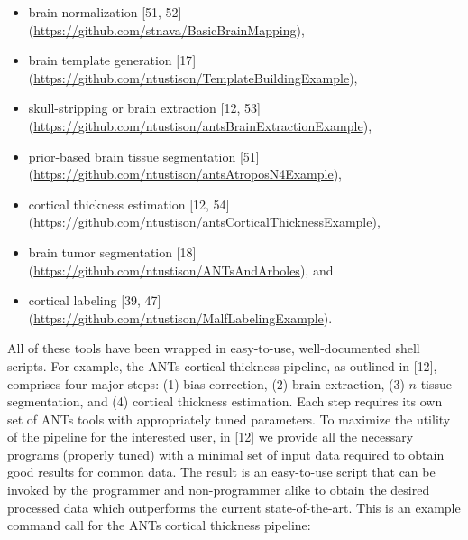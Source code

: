 \documentclass[11pt,]{article}
\newenvironment{Shaded}{\begin{snugshade}}{\end{snugshade}}
\newcommand{\KeywordTok}[1]{\textcolor[rgb]{0.13,0.29,0.53}{\textbf{{#1}}}}
\newcommand{\CommentTok}[1]{\textcolor[rgb]{0.56,0.35,0.01}{\textit{{#1}}}}
\newcommand{\NormalTok}[1]{{#1}}
\begin{document}
\begin{itemize}
\itemsep1pt\parskip0pt
\item
  brain normalization {[}51, 52{]}
  (\url{https://github.com/stnava/BasicBrainMapping}),
\item
  brain template generation {[}17{]}
  (\url{https://github.com/ntustison/TemplateBuildingExample}),
\item
  skull-stripping or brain extraction {[}12, 53{]}
  (\url{https://github.com/ntustison/antsBrainExtractionExample}),
\item
  prior-based brain tissue segmentation {[}51{]}
  (\url{https://github.com/ntustison/antsAtroposN4Example}),
\item
  cortical thickness estimation {[}12, 54{]}
  (\url{https://github.com/ntustison/antsCorticalThicknessExample}),
\item
  brain tumor segmentation {[}18{]}
  (\url{https://github.com/ntustison/ANTsAndArboles}), and
\item
  cortical labeling {[}39, 47{]}
  (\url{https://github.com/ntustison/MalfLabelingExample}).
\end{itemize}

All of these tools have been wrapped in easy-to-use, well-documented
shell scripts. For example, the ANTs cortical thickness pipeline, as
outlined in {[}12{]}, comprises four major steps: (1) bias correction,
(2) brain extraction, (3) $n$-tissue segmentation, and (4) cortical
thickness estimation. Each step requires its own set of ANTs tools with
appropriately tuned parameters. To maximize the utility of the pipeline
for the interested user, in {[}12{]} we provide all the necessary
programs (properly tuned) with a minimal set of input data required to
obtain good results for common data. The result is an easy-to-use script
that can be invoked by the programmer and non-programmer alike to obtain
the desired processed data which outperforms the current
state-of-the-art. This is an example command call for the ANTs cortical
thickness pipeline:

\begin{Shaded}
\end{Shaded}
\end{document}
